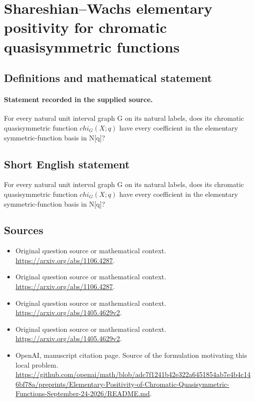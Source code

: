 \documentclass[11pt]{article}
\begin{document}
\section*{Shareshian–Wachs elementary positivity for chromatic quasisymmetric functions}\label{statement}
\subsection{Definitions and mathematical statement}
\paragraph{Statement recorded in the supplied source.}
For every natural unit interval graph G on its natural labels, does its chromatic quasisymmetric function $chi_G(X;q)$ have every coefficient in the elementary symmetric-function basis in N[q]?
\subsection{Short English statement}
For every natural unit interval graph G on its natural labels, does its chromatic quasisymmetric function $chi_G(X;q)$ have every coefficient in the elementary symmetric-function basis in N[q]?
\subsection{Sources}
\begin{itemize}
\item[S1] Original question source or mathematical context.
\url{https://arxiv.org/abs/1106.4287}.
\item[S2] Original question source or mathematical context.
\url{https://arxiv.org/abs/1106.4287}.
\item[S3] Original question source or mathematical context.
\url{https://arxiv.org/abs/1405.4629v2}.
\item[S4] Original question source or mathematical context.
\url{https://arxiv.org/abs/1405.4629v2}.
\item[S5] OpenAI, manuscript citation page. Source of the formulation motivating this local problem.
\url{https://github.com/openai/math/blob/adc7f1241b42e322a6451854ab7e4b4c146bf78a/preprints/Elementary-Positivity-of-Chromatic-Quasisymmetric-Functions-September-24-2026/README.md}.
\end{itemize}
\end{document}
